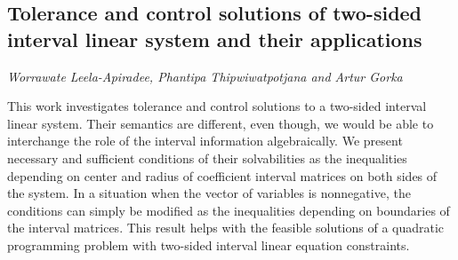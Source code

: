 \documentclass[../booklet.tex]{subfiles}
\begin{document}
\subsection[Tolerance and control solutions of two-sided interval linear system and their applications. {\it Worrawate Leela-Apiradee, Phantipa Thipwiwatpotjana and Artur Gorka}]{Tolerance and control solutions of two-sided interval linear system and their applications}
  

\begin{center}
  {\it Worrawate Leela-Apiradee, Phantipa Thipwiwatpotjana and Artur Gorka}
\end{center}



This work investigates tolerance and control solutions to a two-sided interval linear system. Their semantics are different, even though, we would be able to interchange the role of the interval information algebraically. We present   necessary and sufficient conditions of their solvabilities as the inequalities depending on center and radius of coefficient interval matrices on both sides of the system. In a situation when the vector of variables is nonnegative, the conditions can simply be modified as the inequalities depending on boundaries of the interval matrices. This result helps with the feasible solutions of a quadratic programming problem with two-sided interval linear equation constraints. 



\end{document}
